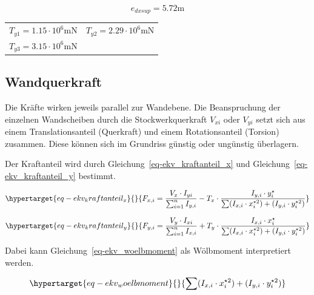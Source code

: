 \documentclass[
  letterpaper,
  DIV=11]{scrreprt}
\begin{document}
\begin{equation}e_{dxsup} = 5.72 \text{m}\end{equation}

\begin{longtable}[]{@{}
  >{\raggedright\arraybackslash}p{}
  >{\raggedright\arraybackslash}p{}@{}}
\toprule\noalign{}
\endhead
\bottomrule\noalign{}
\endlastfoot
\(T_{y1} = 1.15 \cdot 10^{6} \text{m} \text{N}\) &
\(T_{y2} = 2.29 \cdot 10^{6} \text{m} \text{N}\) \\
\(T_{y3} = 3.15 \cdot 10^{6} \text{m} \text{N}\) & \\
\end{longtable}

\hypertarget{wandquerkraft}{%
\subsection{Wandquerkraft}\label{wandquerkraft}}

Die Kräfte wirken jeweils parallel zur Wandebene. Die Beanspruchung der
einzelnen Wandscheiben durch die Stockwerkquerkraft \(V_{xi}\) oder
\(V_{yi}\) setzt sich aus einem Translationsanteil (Querkraft) und einem
Rotationsanteil (Torsion) zusammen. Diese können sich im Grundriss
günstig oder ungünstig überlagern.

Der Kraftanteil wird durch Gleichung~\ref{eq-ekv_kraftanteil_x} und
Gleichung~\ref{eq-ekv_kraftanteil_y} bestimmt.

\begin{equation}\protect\hypertarget{eq-ekv_kraftanteil_x}{}{
F_{x,i} = \frac{V_{x} \cdot I_{yi}}{\sum_{i=1}^n I_{y,i}} - T_{x} \cdot \frac{I_{y,i} \cdot y_i^\star}{\sum (I_{x,i} \cdot x_i^{\star 2}) + ( I_{y,i} \cdot y_i^{\star 2})}
}\label{eq-ekv_kraftanteil_x}\end{equation}

\begin{equation}\protect\hypertarget{eq-ekv_kraftanteil_y}{}{
F_{y,i} = \frac{V_{y} \cdot I_{xi}}{\sum_{i=1}^n I_{x,i}} + T_{y} \cdot \frac{I_{x,i} \cdot x_i^\star}{\sum (I_{x,i} \cdot x_i^{\star 2}) + ( I_{y,i} \cdot y_i^{\star 2})}
}\label{eq-ekv_kraftanteil_y}\end{equation}

Dabei kann Gleichung~\ref{eq-ekv_woelbmoment} als Wölbmoment
interpretiert werden.

\begin{equation}\protect\hypertarget{eq-ekv_woelbmoment}{}{
\sum (I_{x,i} \cdot x_i^{\star 2}) + ( I_{y,i} \cdot y_i^{\star 2})
}\label{eq-ekv_woelbmoment}\end{equation}
\end{document}
